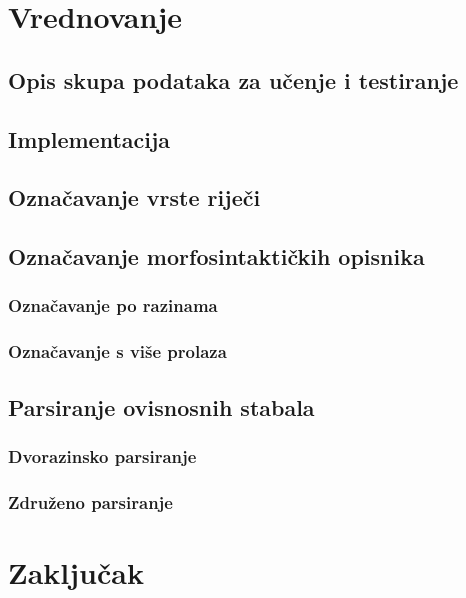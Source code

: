 \documentclass[times, utf8, diplomski]{fer}
\begin{document}
\chapter{Vrednovanje}

\section{Opis skupa podataka za učenje i testiranje}


\section{Implementacija}

\section{Označavanje vrste riječi}

\section{Označavanje morfosintaktičkih opisnika}

\subsection{Označavanje po razinama}

\subsection{Označavanje s više prolaza}

\section{Parsiranje ovisnosnih stabala}

\subsection{Dvorazinsko parsiranje}

\subsection{Združeno parsiranje}

\chapter{Zaključak}










\nocite{daume06thesis}
\nocite{daume09searn}
\nocite{daume06searn-practice}
\nocite{daume15reductions}
\nocite{daume15lols}
\nocite{daume15rewrite}
\nocite{daume14lts}
\end{document}
